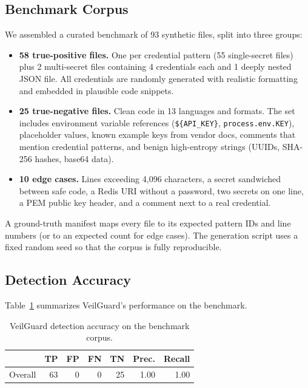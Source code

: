 \documentclass[conference]{IEEEtran}
\begin{document}
\subsection{Benchmark Corpus}
\label{sec:corpus}

We assembled a curated benchmark of 93 synthetic files, split into three
groups:

\begin{itemize}
  \item \textbf{58 true-positive files.} One per credential pattern (55
        single-secret files) plus 2 multi-secret files containing 4 credentials
        each and 1 deeply nested JSON file. All credentials are randomly
        generated with realistic formatting and embedded in plausible code
        snippets.
  \item \textbf{25 true-negative files.} Clean code in 13 languages and
        formats. The set includes environment variable references
        (\texttt{\$\{API\_KEY\}}, \texttt{process.env.KEY}), placeholder
        values, known example keys from vendor docs, comments that mention
        credential patterns, and benign high-entropy strings (UUIDs, SHA-256
        hashes, base64 data).
  \item \textbf{10 edge cases.} Lines exceeding 4{,}096 characters, a secret
        sandwiched between safe code, a Redis URI without a password, two
        secrets on one line, a PEM public key header, and a comment next to a
        real credential.
\end{itemize}

A ground-truth manifest maps every file to its expected pattern IDs and line
numbers (or to an expected count for edge cases). The generation script uses a
fixed random seed so that the corpus is fully reproducible.

\subsection{Detection Accuracy}
\label{sec:accuracy}

Table~\ref{tab:detection-accuracy} summarizes VeilGuard's performance on the
benchmark.

\begin{table}[ht]
\centering
\caption{VeilGuard detection accuracy on the benchmark corpus.}
\label{tab:detection-accuracy}
\begin{tabular}{lrrrrrr}
\toprule
 & TP & FP & FN & TN & Prec. & Recall \\
\midrule
Overall & 63 & 0 & 0 & 25 & 1.00 & 1.00 \\
\bottomrule
\end{tabular}
\end{table}
\end{document}

